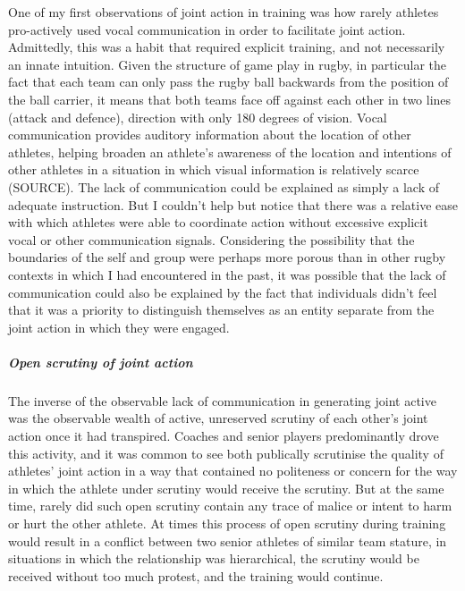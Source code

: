 \begin{CJK}{UTF8}{gbsn}
One of my first observations of joint action in training was how rarely athletes pro-actively used vocal communication in order to facilitate joint action.  Admittedly, this was a habit that required explicit training, and not necessarily an innate intuition.  Given the structure of game play in rugby, in particular the fact that each team can only pass the rugby ball backwards from the position of the ball carrier, it means that both teams face off against each other in two lines (attack and defence), direction with only 180 degrees of vision. Vocal communication provides auditory information about the location of other athletes, helping broaden an athlete's awareness of the location and intentions of other athletes in a situation in which visual information is relatively scarce (SOURCE).  The lack of communication could be explained as simply a lack of adequate instruction.  But I couldn't help but notice that there was a relative ease with which athletes were able to coordinate action without excessive explicit vocal or other communication signals.  Considering the possibility that the boundaries of the self and group were perhaps more porous than in other rugby contexts in which I had encountered in the past, it was possible that the lack of communication could also be explained by the fact that individuals didn't feel that it was a priority to distinguish themselves as an entity separate from the joint action in which they were engaged.





\subparagraph{Open scrutiny of joint action}
The inverse of the observable lack of communication in generating joint active was the observable wealth of active, unreserved scrutiny of each other's joint action once it had transpired.  Coaches and senior players predominantly drove this activity, and it was common to see both publically scrutinise the quality of athletes' joint action in a way that contained no politeness or concern for the way in which the athlete under scrutiny would receive the scrutiny. But at the same time, rarely did such open scrutiny contain any trace of malice or intent to harm or hurt the other athlete.  At times this process of open scrutiny during training would result in a conflict between two senior athletes of similar team stature, in situations in which the relationship was hierarchical, the scrutiny would be received without too much protest, and the training would continue.


\end{CJK}
